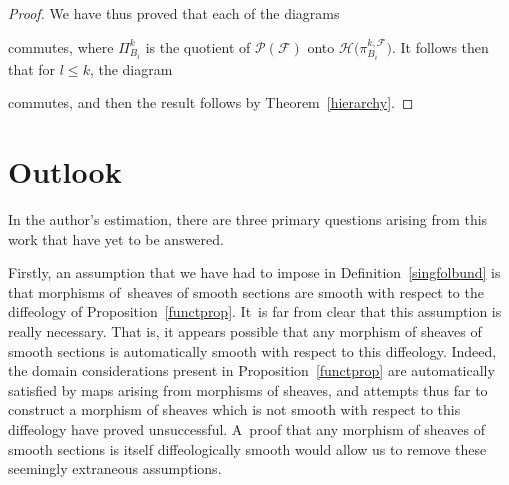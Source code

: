 \documentclass[pdftex]{sigma}
\numberwithin{equation}{section}
\def\id{\operatorname{id}}
\def\FF{{\mathcal{F}}}
\def\HH{{\mathcal{H}}}
\def\PP{{\mathcal{P}}}
\begin{document}
\begin{proof}
We have thus proved that each of the diagrams\vspace{-1ex}
\begin{center}
\end{center}
commutes, where $\Pi_{B_{i}}^{k}$ is the quotient of $\PP(\FF)$ onto $\HH\big(\pi_{B_{i}}^{k,\FF}\big)$. It follows then that for $l\leq k$, the diagram\vspace{-1ex}
\begin{center}
\end{center}
commutes, and then the result follows by Theorem~\ref{hierarchy}.
\end{proof}

\section{Outlook}\label{sec5}

In the author's estimation, there are three primary questions arising from this work that have yet to be answered.

Firstly, an assumption that we have had to impose in Definition~\ref{singfolbund} is that morphisms of~sheaves of smooth sections are smooth with respect to the diffeology of Proposition~\ref{functprop}. It~is far from clear that this assumption is really necessary. That is, it appears possible that any morphism of sheaves of smooth sections is automatically smooth with respect to this diffeology. Indeed, the domain considerations present in Proposition~\ref{functprop} are automatically satisfied by maps arising from morphisms of sheaves, and attempts thus far to construct a morphism of sheaves which is not smooth with respect to this diffeology have proved unsuccessful. A~proof that any morphism of sheaves of smooth sections is itself diffeologically smooth would allow us to remove these seemingly extraneous assumptions.
\end{document}
